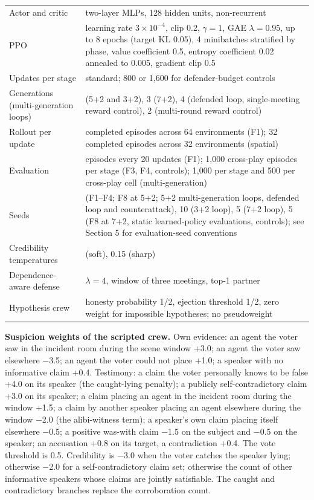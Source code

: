 \documentclass[
  12pt,
]{article}
\begin{document}
\begin{longtable}[]{@{}
  >{\raggedright\arraybackslash}p{}
  >{\raggedright\arraybackslash}p{}@{}}
Actor and critic & two-layer MLPs, 128 hidden units, non-recurrent \\
PPO & learning rate \(3\times10^{-4}\), clip 0.2, \(\gamma = 1\), GAE
\(\lambda = 0.95\), up to 8 epochs (target KL 0.05), 4 minibatches
stratified by phase, value coefficient 0.5, entropy coefficient 0.02
annealed to 0.005, gradient clip 0.5 \\
Updates per stage & 400 standard; 800 or 1,600 for defender-budget
controls \\
Generations (multi-generation loops) & 10 (5+2 and 3+2), 3 (7+2), 4
(defended loop, single-meeting reward control), 2 (multi-round reward
control) \\
Rollout per update & 64 completed episodes across 64 environments (F1);
32 completed episodes across 32 environments (spatial) \\
Evaluation & 400 episodes every 20 updates (F1); 1,000 cross-play
episodes per stage (F3, F4, controls); 1,000 per stage and 500 per
cross-play cell (multi-generation) \\
Seeds & 10 (F1--F4; F8 at 5+2; 5+2 multi-generation loops, defended loop
and counterattack), 10 (3+2 loop), 5 (7+2 loop), 5 (F8 at 7+2, static
learned-policy evaluations, controls); see Section 5 for evaluation-seed
conventions \\
Credibility temperatures & 1.5 (soft), 0.15 (sharp) \\
Dependence-aware defense & \(\lambda = 4\), window of three meetings,
top-1 partner \\
Hypothesis crew & honesty probability 1/2, ejection threshold 1/2, zero
weight for impossible hypotheses; no pseudoweight \\
\end{longtable}

\textbf{Suspicion weights of the scripted crew.} Own evidence: an agent
the voter saw in the incident room during the scene window +3.0; an
agent the voter saw elsewhere −3.5; an agent the voter could not place
+1.0; a speaker with no informative claim +0.4. Testimony: a claim the
voter personally knows to be false +4.0 on its speaker (the caught-lying
penalty); a publicly self-contradictory claim +3.0 on its speaker; a
claim placing an agent in the incident room during the window +1.5; a
claim by another speaker placing an agent elsewhere during the window
−2.0 (the alibi-witness term); a speaker's own claim placing itself
elsewhere −0.5; a positive was-with claim −1.5 on the subject and −0.5
on the speaker; an accusation +0.8 on its target, a contradiction +0.4.
The vote threshold is 0.5. Credibility is −3.0 when the voter catches
the speaker lying; otherwise −2.0 for a self-contradictory claim set;
otherwise the count of other informative speakers whose claims are
jointly satisfiable. The caught and contradictory branches replace the
corroboration count.
\end{document}
